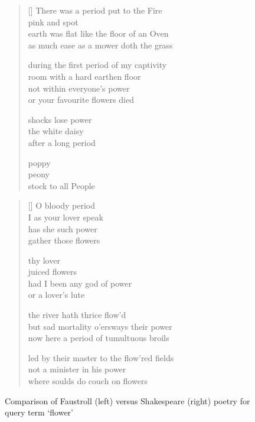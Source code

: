 \begin{figure}[h!]
\centering
\begin{minipage}{.45\linewidth}
  \settowidth{\versewidth}{earth was flat like the floor of an Oven}
  \begin{verse}[\versewidth]\sffamily\footnotesize
    There was a period put to the Fire\\
    pink and spot\\
    earth was flat like the floor of an Oven\\
    as much ease as a mower doth the grass

    during the first period of my captivity\\
    room with a hard earthen floor\\
    not within everyone's power\\
    or your favourite flowers died

    shocks lose power\\
    the white daisy\\
    after a long period

    poppy\\
    peony\\
    stock to all People
  \end{verse}
\end{minipage}
\hspace{.02\linewidth}
\begin{minipage}{.45\linewidth}
  \settowidth{\versewidth}{led by their master to the flow'red fields}
  \begin{verse}[\versewidth]\sffamily\footnotesize
    O bloody period\\
    I as your lover speak\\
    has she such power\\
    gather those flowers

    thy lover\\
    juiced flowers\\
    had I been any god of power\\
    or a lover's lute

    the river hath thrice flow'd\\
    but sad mortality o'ersways their power\\
    now here a period of tumultuous broils

    led by their master to the flow'red fields\\
    not a minister in his power\\
    where soulds do couch on flowers
  \end{verse}
\end{minipage}
\caption[Faustroll vs. Shakespeare poetry]{Comparison of Faustroll (left) versus Shakespeare (right) poetry for query term `flower'}
\label{fig:2poems}
\end{figure}


